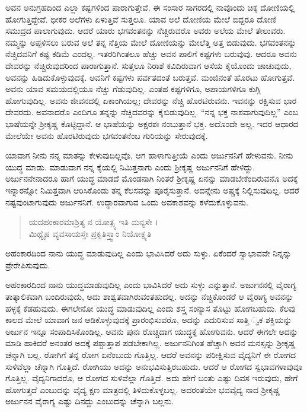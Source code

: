 ಅವನ ಅನುಗ್ರಹದಿಂದ ಎಲ್ಲಾ ಕಷ್ಟಗಳಿಂದ ಪಾರಾಗುತ್ತೇವೆ. ಈ ಸಂಸಾರ ಸಾಗರದಲ್ಲಿ ನಾವೊಂದು ಚಿಕ್ಕ ದೋಣಿಯಲ್ಲಿ ಹೋಗುತ್ತಿದ್ದೇವೆ. ಭೀಕರ ಅಲೆಗಳು ಏಳುತ್ತಿವೆ ಸುತ್ತಲೂ. ಯಾವ ಅಲೆ ದೋಣಿಯ ಮೇಲೆ ಬಿದ್ದರೂ ದೋಣಿ ಸಮುದ್ರದ ಪಾಲಾಗುವುದು. ಆದರೆ ಯಾರು ಭಗವಂತನನ್ನು ನೆಚ್ಚಿರುವರೊ ಅವರು ಅಲೆಯ ಮೇಲೆ ತೇಲುವರು. ನಮ್ಮನ್ನು ಅಪ್ಪಳಿಸಲು ಬರುವ ಅಲೆ ತನ್ನ ನೆತ್ತಿಯ ಮೇಲೆ ದೋಣಿಯನ್ನು ಮೇಲೆತ್ತಿ ಅತ್ತ ಬಿಡುವುದು. ಭಗವಂತನನ್ನು ನೆಚ್ಚಿದವನಿಗೆ ಕಷ್ಟ ಕಡಿಮೆ ಎಂದಲ್ಲ. ಇತರರಿಗಿಂತಲೂ ಹೆಚ್ಚು ಅವನ ಪಾಲಿಗೆ ಕಷ್ಟಗಳು ಬರುವುವು. ಆದರೂ ಅವನು ದೇವರನ್ನು ನೆಚ್ಚಿರುವುದರಿಂದ ಪಾರಾಗುತ್ತಾನೆ. ಸುತ್ತಲೂ ನಿರಾಶೆ ಕವಿದಿರುವಾಗ ಆಸೆಯ ಕೈಯೊಂದು ಚಾಚುವುದು, ಅವನನ್ನು ಹಿಡಿದುಕೊಳ್ಳುವುದಕ್ಕೆ. ಅವನಿಗೆ ಕಷ್ಟಗಳು ಪರ್ವತದಂತೆ ಬರುತ್ತವೆ. ಮಂಜಿನಂತೆ ಹೊರಟು ಹೋಗುತ್ತವೆ. ಅವನು ಯಾವ ಸಮಯದಲ್ಲಿಯೂ ನೆಚ್ಚು ಗೆಡುವುದಿಲ್ಲ. ಎಂತಹ ಕಷ್ಟಗಳಿಗೂ, ಅಪಾಯಗಳಿಗೂ ಕುಗ್ಗಿ ಹೋಗುವುದಿಲ್ಲ. ಅವನು ಜೀವನದಲ್ಲಿ ಏಕಾಂಗಿಯಲ್ಲ; ದೇವರನ್ನು ನೆಚ್ಚಿ ಹೊರಟಿರುವನು. ಇವನನ್ನು ರಕ್ಷಿಸುವ ಭಾರ ದೇವರದು. ಅವನಾದರೊ ಎಂದಿಗೂ ತನ್ನನ್ನು ನೆಚ್ಚಿದವರನ್ನು ಕೈಬಿಡುವುದಿಲ್ಲ. “ನನ್ನ ಭಕ್ತ ನಾಶವಾಗುವುದಿಲ್ಲ” ಎಂಬ ಭಾಷೆಯನ್ನೇ ಶ್ರೀಕೃಷ್ಣ ಕೊಟ್ಟಿದ್ದಾನೆ. ಆ ಭಾಷೆಯನ್ನು ಅಕ್ಷರಶಃ ನಂಬುತ್ತಾನೆ ಭಕ್ತ. ಅದೊಂದೇ ಅಲ್ಲ. ಇದರ ಆಧಾರದ ಮೇಲೆಯೇ ಅವನು ಹೊರಟಿರುವುದು ಭಗವಂತನೆಂಬ ಗುರಿಯನ್ನು ಸೇರುವುದಕ್ಕೆ.

ಯಾವಾಗ ನೀನು ನನ್ನ ಮಾತನ್ನು ಕೇಳುವುದಿಲ್ಲವೊ, ಆಗ ಹಾಳಾಗುತ್ತೀಯೆ ಎಂದು ಅರ್ಜುನನಿಗೆ ಹೇಳುವನು. ನೀನು ಯುದ್ಧ ಮಾಡು. ಮಾಡುವಾಗ ನನ್ನ ಕೈಯಲ್ಲಿ ನಿಮಿತ್ತನಾಗು ಎಂದು ಶ್ರೀಕೃಷ್ಣ ಅರ್ಜುನನಿಗೆ ಹೇಳಿದ್ದು. ಅರ್ಜುನನೇನಾದರೂ ಹಾಗೆ ಯುದ್ಧ ಮಾಡದೆ ಮೊಂಡನಾಗಿ ನಿಂತರೆ ಶ್ರೀಕೃಷ್ಣ ಏನನ್ನು ಮಾಡಬೇಕೆಂದಿರುವನೊ ಅದಕ್ಕೆ ಇನ್ನಾರನ್ನೋ ನಿಮಿತ್ತವಾಗಿ ಆರಿಸಿಕೊಂಡು ತನ್ನ ಕೆಲಸವನ್ನು ಪೂರೈಸುತ್ತಾನೆ. ಅದನ್ನೇನು ಅಷ್ಚಕ್ಕೆ ನಿಲ್ಲಿಸುವುದಿಲ್ಲ. ಆದರೆ ನಷ್ಟವುಂಟಾಗುವುದು ಅರ್ಜುನನಿಗೆ. ಉದ್ಧಾರವಾಗುವ ಒಂದು ಅವಕಾಶವನ್ನು ಕಳೆದುಕೊಳ್ಳುವನು.

\begin{verse}
ಯದಹಂಕಾರಮಾಶ್ರಿತ್ಯ ನ ಯೋತ್ಸ್ಯ ಇತಿ ಮನ್ಯಸೇ ।\\ಮಿಥ್ಯೈಷ ವ್ಯವಸಾಯಸ್ತೇ ಪ್ರಕೃತಿಸ್ತ್ವಾಂ ನಿಯೋಕ್ಷ್ಯತಿ 
\end{verse}

{\small ಅಹಂಕಾರದಿಂದ ನಾನು ಯುದ್ಧ ಮಾಡುವುದಿಲ್ಲ ಎಂದು ಭಾವಿಸಿದರೆ ಅದು ಸುಳ್ಳು. ಏಕೆಂದರೆ ಸ್ವಾಭಾವವೇ ನಿನ್ನನ್ನು ಪ್ರೇರೇಪಿಸುವುದು.}

ಅಹಂಕಾರದಿಂದ ನಾನು ಯುದ್ಧಮಾಡುವುದಿಲ್ಲ ಎಂದು ಭಾವಿಸಿದರೆ ಅದು ಸುಳ್ಳು ಎನ್ನುತ್ತಾನೆ. ಅರ್ಜುನನಲ್ಲಿ ವೈರಾಗ್ಯ ತಾತ್ಕಾಲಿಕವಾಗಿ ಬಂದಿರುವುದು, ಅದು ಶಾಶ್ವತವಾಗಿರುವಂತಹುದಲ್ಲ. ಅದನ್ನು ನೆಚ್ಚಿಕೊಂಡರೆ ಆ ವೈರಾಗ್ಯ ಅವನನ್ನು ಹಳ್ಳಕ್ಕೆ ಕೆಡಹುವುದು. ಈಗಲೇನೋ ಯುದ್ಧ ಮಾಡುವುದಿಲ್ಲ ಎಂದು ಶಸ್ತ್ರ ಸಂನ್ಯಾಸ ತೊಟ್ಟು ಹೋಗಬಹುದು. ಕೆಲವು ಕಾಲದ ಮೇಲೆ ಯಾವಾಗ ಜನ ಆಡಿಕೊಳ್ಳುವುದಕ್ಕೆ ಪ್ರಾರಂಭಿಸುವರೊ, ಅದನ್ನು ಎದುರಿಸುವ ಸಾತ್ತಿ ್ವಕ ಶಕ್ತಿಯನ್ನು ಅರ್ಜುನ ಇನ್ನೂ ಸಂಪಾದಿಸಿಕೊಂಡಿಲ್ಲ. ಅವನು ಪುನಃ ರೊಚ್ಚಿದಾಗ ಯುದ್ಧಕ್ಕೆ ಹೋಗುವನು. ಆದರೆ ಈಗಲೇ ಅದನ್ನು ಮಾಡಿ ಹಾಕಿದರೆ ಅನಂತರ ಅದಕ್ಕೆ ಪಶ್ಚಾತ್ತಾಪ ಪಡಬೇಕಾಗಿಲ್ಲ. ಅರ್ಜುನನಿಗಿಂತ ಹೆಚ್ಚಾಗಿ ಅವನ ಮನಸ್ಸನ್ನು ಶ್ರೀಕೃಷ್ಣ ಚೆನ್ನಾಗಿ ಬಲ್ಲ. ರೋಗಿಗೆ ತನ್ನ ರೋಗ ಏನೆಂಬುದು ಗೊತ್ತಿಲ್ಲ. ಆದರೆ ಅವನನ್ನು ಪರೀಕ್ಷಿಸುವ ವೈದ್ಯನಿಗೆ ಈ ರೋಗದ ಸುಳಿವೆಲ್ಲಾ ಚೆನ್ನಾಗಿ ಗೊತ್ತಿದೆ. ರೋಗಿಯು ಅದನ್ನು ಅನುಭವಿಸುತ್ತಿರಬಹುದು. ಆದರೆ ಆ ರೋಗದ ಸ್ವಭಾವಗಳಾವುವೂ ಗೊತ್ತಿಲ್ಲ. ವೈದ್ಯನಿಗಾದರೊ, ಆ ರೋಗದ ಸುಳಿವೆಲ್ಲಾ ಗೊತ್ತಿದೆ. ಅದು ಹೇಗೆ ಬಂತು ಎಷ್ಟು ದಿವಸ ಇರುವುದು, ಹೇಗೆ ಹೋಗುತ್ತದೆ ಎಂಬುದನ್ನು ವೈದ್ಯ ಕ್ಷಣ ಮಾತ್ರದಲ್ಲಿ ತಿಳಿದುಕೊಳ್ಳಬಲ್ಲ. ಅದರಂತೆಯೇ ಭವವೈದ್ಯ ನಾದ ಶ್ರೀಕೃಷ್ಣ ಅರ್ಜುನನ ವೈರಾಗ್ಯ ಎಷ್ಟು ದಿನದ್ದು ಎಂಬುದನ್ನು ಚೆನ್ನಾಗಿ ಬಲ್ಲನು.

